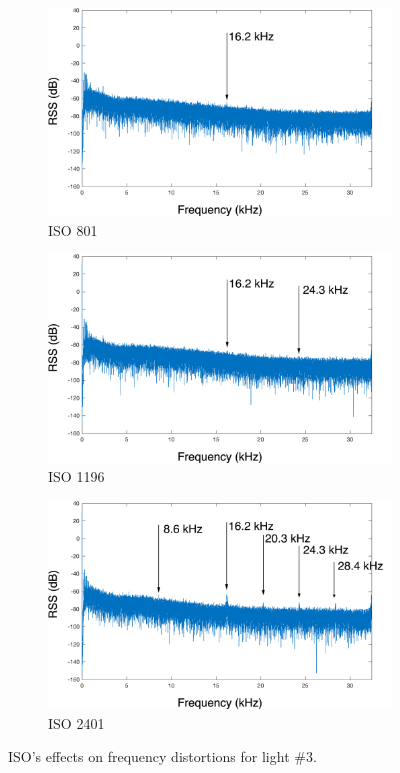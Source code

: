 \documentclass[conference]{IEEEtran}
\begin{document}
\begin{figure}[!h]
	\begin{subfigure}{.33\textwidth}
		\centering
		\includegraphics[width=1\linewidth]{figures/C/801.png}
		\caption{ISO 801}
	\end{subfigure}
	\begin{subfigure}{.33\textwidth}
		\centering
		\includegraphics[width=1\linewidth]{figures/C/1196.png}
		\caption{ISO 1196}
	\end{subfigure}
	\begin{subfigure}{.33\textwidth}
		\centering
		\includegraphics[width=1\linewidth]{figures/C/2401.png}
		\caption{ISO 2401}
	\end{subfigure}
	\caption{ISO's effects on frequency distortions for light \#3.}
	\label{fig:isosimpact}
\end{figure}
\end{document}
